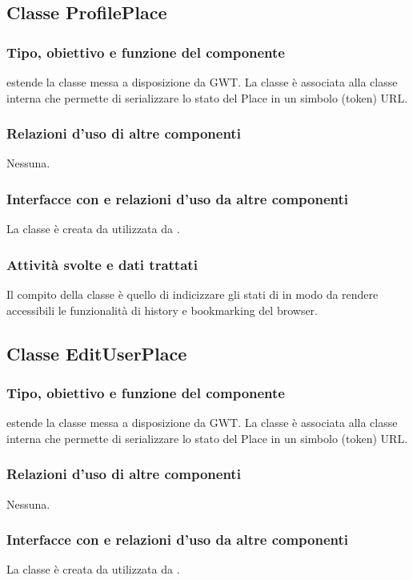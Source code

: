 \subsection{Classe ProfilePlace}
\subsubsection*{Tipo, obiettivo e funzione del componente}
 estende la classe  messa a disposizione da GWT. La
classe \`e associata alla classe interna  che permette di
serializzare lo stato del Place in un simbolo (token) URL.
\subsubsection*{Relazioni d'uso di altre componenti}
Nessuna.
\subsubsection*{Interfacce con e relazioni d'uso da altre componenti}
La classe \`e creata da  utilizzata da .
\subsubsection*{Attivit\`a svolte e dati trattati}
Il compito della classe \`e quello di indicizzare gli stati di
 in modo da rendere accessibili le funzionalit\`a di history
e bookmarking del browser.

\subsection{Classe EditUserPlace}
\subsubsection*{Tipo, obiettivo e funzione del componente}
 estende la classe  messa a disposizione da GWT. La
classe \`e associata alla classe interna  che permette di
serializzare lo stato del Place in un simbolo (token) URL.
\subsubsection*{Relazioni d'uso di altre componenti}
Nessuna.
\subsubsection*{Interfacce con e relazioni d'uso da altre componenti}
La classe \`e creata da  utilizzata da .
